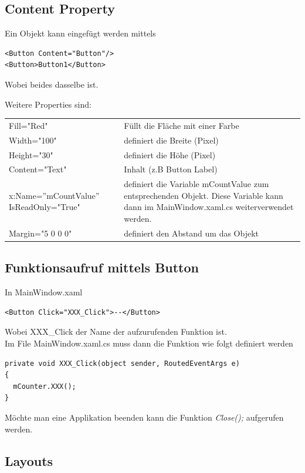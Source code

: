 \subsection{Content Property}
Ein Objekt kann eingefügt werden mittels
\begin{lstlisting}[style=CSharp]
<Button Content="Button"/>
<Button>Button1</Button>
\end{lstlisting}
Wobei beides dasselbe ist.


Weitere Properties sind:\\
\begin{tabular}{lp{10cm}}
  Fill="Red" & Füllt die Fläche mit einer Farbe \\
  Width="100" & definiert die Breite (Pixel) \\
  Height="30" & definiert die Höhe (Pixel) \\
  Content="Text" & Inhalt (z.B Button Label) \\
  x:Name=''mCountValue'' IsReadOnly="True" & definiert die Variable mCountValue zum entsprechenden Objekt.
                         Diese Variable kann dann im MainWindow.xaml.cs weiterverwendet werden.\\
  Margin="5 0 0 0" & definiert den Abstand um das Objekt\\
\end{tabular}

\subsection{Funktionsaufruf mittels Button}
In MainWindow.xaml
\begin{lstlisting}[style=CSharp]
<Button Click="XXX_Click">--</Button>
\end{lstlisting}
Wobei XXX\_Click der Name der aufzurufenden Funktion ist.\\

Im File MainWindow.xaml.cs muss dann die Funktion wie folgt definiert werden
\begin{lstlisting}[style=CSharp]
private void XXX_Click(object sender, RoutedEventArgs e)
{
  mCounter.XXX();
}
\end{lstlisting}

Möchte man eine Applikation beenden kann die Funktion \textit{Close();} aufgerufen werden.

\subsection{Layouts}
